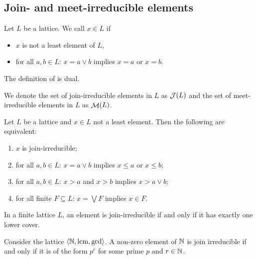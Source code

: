 \subsection{Join- and meet-irreducible elements}
\begin{definition}
Let $L$ be a lattice. We call $x\in L$  if
\begin{itemize}
\item $x$ is not a least element of $L$,
\item for all $a,b\in L$: $x= a\vee b$ implies $x=a$ or $x=b$.
\end{itemize}
The definition of  is dual.

We denote the set of join-irreducible elements in $L$ as $\mathop{\mathcal{J}}(L)$ and the set of meet-irreducible elements in $L$ as $\mathop{\mathcal{M}}(L)$.
\end{definition}

\begin{lemma}
Let $L$ be a lattice and $x\in L$ not a least element. Then the following are equivalent:
\begin{enumerate}
\item $x$ is join-irreducible;
\item for all $a,b\in L$: $x= a\vee b$ implies $x \leq a$ or $x \leq b$;
\item for all $a,b\in L$: $x > a$ and $x > b$ implies $x > a\vee b$;
\item for all finite $F\subseteq L$: $x = \bigvee F$ implies $x\in F$.
\end{enumerate}
\end{lemma}

\begin{lemma}
In a finite lattice $L$, an element is join-irreducible if and only if it
has exactly one lower cover.
\end{lemma}

\begin{example}
Consider the lattice $\langle \mathbb{N},\operatorname{lcm}, \gcd \rangle$. A non-zero element of $\mathbb{N}$ is join irreducible if and only if it is of the form $p^r$ for some prime $p$ and $r\in\mathbb{N}$.
\end{example}

